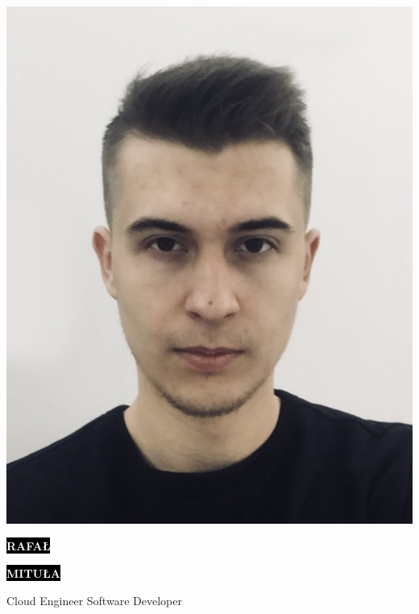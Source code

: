 \documentclass[9pt]{developercv} %
\begin{document}
\renewcommand{\headrulewidth}{0pt}%
\fancyhead{}
\begin{minipage}[t]{0.15\textwidth} %
	\vspace{-\baselineskip}	
	\includegraphics[width=1\columnwidth]{photo.png}\\ 
	
\end{minipage}
\begin{minipage}[t]{0.45\textwidth} %
	\vspace{-\baselineskip} %
	
	\begin{addmargin}[0.2cm]{0cm}
		
		\colorbox{black}{{\HUGE\textcolor{white}{\textbf{\MakeUppercase{Rafał}}}}} %
			
		\colorbox{black}{{\HUGE\textcolor{white}{\textbf{\MakeUppercase{Mituła}}}}} %
		\vspace{7pt}
			
		{\huge Cloud Engineer  \newline Software Developer} %
	\end{addmargin}
	
\end{minipage}
\end{document}
